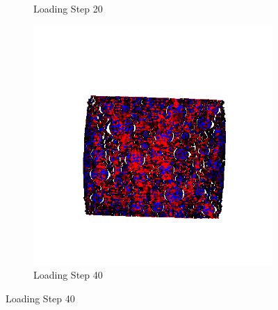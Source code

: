 \begin{figure}[ht]
\begin{subfigure}{.33\textwidth}
      \caption{Loading Step 20}
      \end{subfigure}%
      \begin{subfigure}{.33\textwidth}
        \centering
        \includegraphics[width=1.0\linewidth]{Files/A30X-5C_3_IS/DEP50-STEP(060).png}
        \caption{Loading Step 40}
      \end{subfigure}


\end{figure}
